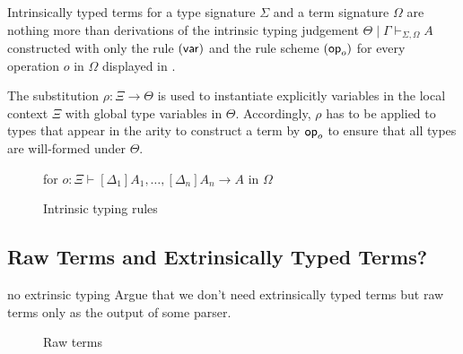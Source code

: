 \documentclass[acmsmall]{acmart}
\theoremstyle{acmdefinition}
\begin{document}
Intrinsically typed terms for a type signature $\Sigma$ and a term signature $\Omega$ are nothing more than derivations of the intrinsic typing judgement $\boxed{\Theta \mid \Gamma \vdash_{\Sigma, \Omega} A}$ constructed with only the rule $(\var)$ and the rule scheme $(\termOp_o)$ for every operation $o$ in $\Omega$ displayed in .

The substitution $\rho\colon \Xi \to \Theta$ is used to instantiate explicitly variables in the local context $\Xi$ with global type variables in $\Theta$.
Accordingly, $\rho$ has to be applied to types that appear in the arity to construct a term by $\termOp_o$ to ensure that all types are will-formed under $\Theta$.

\begin{figure}
  \centering
  \small
  for $o\colon \Xi \vdash [\Delta_1]A_1, \ldots, [\Delta_{n}]A_{n} \to A$ in $\Omega$
  \caption{Intrinsic typing rules}
  \label{fig:intrinsic-typing}
\end{figure}
\subsection{Raw Terms and Extrinsically Typed Terms?}
\begin{LTannote}{no extrinsic typing}
Argue that we don't need extrinsically typed terms but raw terms only as the output of some parser.
\end{LTannote}

\begin{figure}
  \centering
  \begin{mathpar}
  \end{mathpar}
  
  \caption{Raw terms}
\end{figure}
\end{document}
